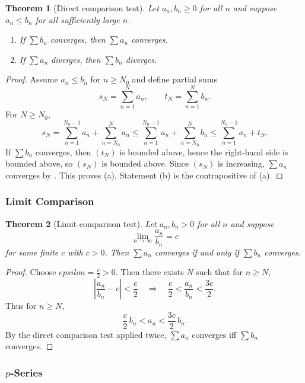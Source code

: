 \documentclass[12pt]{article}
\numberwithin{equation}{section}
\def\eps{epsilon}
\newcommand{\eps}{\varepsilon}               %
\theoremstyle{plain}
\newtheorem{theorem}{Theorem}[section]
\theoremstyle{definition}
\theoremstyle{remark}
\begin{document}
\begin{theorem}[Direct comparison test]\label{thm:comparison}
Let $a_n,b_n\ge 0$ for all $n$ and suppose $a_n\le b_n$ for all sufficiently large $n$.
\begin{enumerate}[label=(\alph*)]
\item If $\sum b_n$ converges, then $\sum a_n$ converges.
\item If $\sum a_n$ diverges, then $\sum b_n$ diverges.
\end{enumerate}
\end{theorem}

\begin{proof}
Assume $a_n\le b_n$ for $n\ge N_0$ and define partial sums
\[
s_N=\sum_{n=1}^{N}a_n,\qquad t_N=\sum_{n=1}^{N}b_n.
\]
For $N\ge N_0$,
\[
s_N = \sum_{n=1}^{N_0-1}a_n + \sum_{n=N_0}^{N} a_n
\le \sum_{n=1}^{N_0-1}a_n + \sum_{n=N_0}^{N} b_n
\le \sum_{n=1}^{N_0-1}a_n + t_N.
\]
If $\sum b_n$ converges, then $(t_N)$ is bounded above, hence the right-hand side is bounded above, so $(s_N)$ is bounded above. Since $(s_N)$ is increasing, $\sum a_n$ converges by . This proves (a).  
Statement (b) is the contrapositive of (a).
\end{proof}

\subsubsection{Limit Comparison}

\begin{theorem}[Limit comparison test]\label{thm:limit-comparison}
Let $a_n,b_n>0$ for all $n$ and suppose
\[
\lim_{n\to\infty}\frac{a_n}{b_n}=c
\]
for some finite $c$ with $c>0$. Then $\sum a_n$ converges if and only if $\sum b_n$ converges.
\end{theorem}

\begin{proof}
Choose $\eps=\frac{c}{2}>0$. Then there exists $N$ such that for $n\ge N$,
\[
\left|\frac{a_n}{b_n}-c\right|<\frac{c}{2}
\quad\Rightarrow\quad
\frac{c}{2}<\frac{a_n}{b_n}<\frac{3c}{2}.
\]
Thus for $n\ge N$,
\[
\frac{c}{2}\,b_n < a_n < \frac{3c}{2}\,b_n.
\]
By the direct comparison test applied twice, $\sum a_n$ converges iff $\sum b_n$ converges.
\end{proof}

\subsubsection{$p$-Series}
\end{document}
